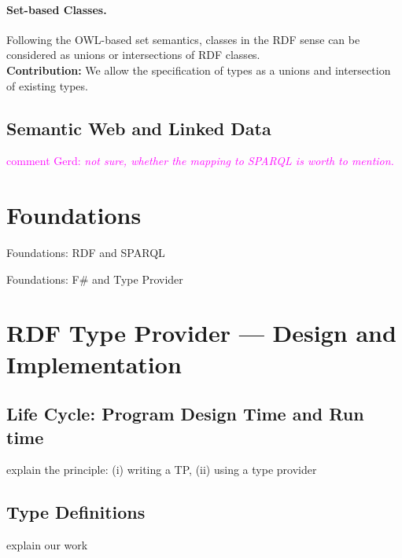 \documentclass{llncs} %
\newcommand{\ggr}[1]{\textcolor{magenta}{comment Gerd: \textit{#1}}}
\newcommand{\fs}{\textsf{F\#}\xspace}
\begin{document}
\paragraph*{\bf Set-based Classes.}
Following the OWL-based set semantics, classes in the RDF sense can be considered as
unions or intersections of RDF classes. \\
\textbf{Contribution:} We allow the specification of types as a unions and intersection of existing types. \\


\subsection{Semantic Web and Linked Data}

\ggr{not sure, whether the mapping to SPARQL is worth to mention.}



\section{Foundations}


Foundations: RDF and SPARQL

Foundations: \fs and Type Provider



\section{RDF Type Provider --- Design and Implementation}
\label{sec:design}


\subsection{Life Cycle: Program Design Time and Run time}
  explain the principle: (i) writing a TP, (ii) using a type provider
	
\subsection{Type Definitions}
  explain our work   
 
\end{document}
